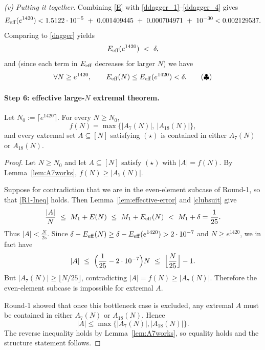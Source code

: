 \medskip
\noindent\emph{(v) Putting it together.}
Combining \eqref{E} with \eqref{ddagger_1}--\eqref{ddagger_4} gives
\[
E_{\rm eff}(e^{1420})
< 1.5122\cdot 10^{-5}\ +\ 0.001409445\ +\ 0.000704971\ +\ 10^{-30}
< 0.002129537.
\]
Comparing to \eqref{dagger} yields
\[
E_{\rm eff}(e^{1420})\ <\ \delta,
\]
and (since each term in $E_{\rm eff}$ decreases for larger $N$) we have
\[
\forall N\ge e^{1420},\qquad E_{\rm eff}(N)\le E_{\rm eff}(e^{1420})<\delta.
\tag{$\clubsuit$}
\]

\paragraph{Step 6: effective large-$N$ extremal theorem.}
\begin{theorem}\label{thm:effective-largeN}
Let $N_0:=\lceil e^{1420}\rceil$.  For every $N\ge N_0$,
\[
f(N)=\max\{|A_7(N)|,\ |A_{18}(N)|\},
\]
and every extremal set $A\subseteq [N]$ satisfying $(\star)$ is contained in either $A_7(N)$ or $A_{18}(N)$.
\end{theorem}

\begin{proof}
Let $N\ge N_0$ and let $A\subseteq [N]$ satisfy $(\star)$ with $|A|=f(N)$.
By Lemma~\ref{lem:A7works}, $f(N)\ge |A_7(N)|$.

Suppose for contradiction that we are in the even-element subcase of Round-1, so that \eqref{R1-Ineq} holds.  Then Lemma~\ref{lem:effective-error} and \eqref{clubsuit} give
\[
\frac{|A|}{N}\ \le\ M_1+E(N)\ \le\ M_1+E_{\rm eff}(N)\ <\ M_1+\delta=\frac{1}{25}.
\]
Thus $|A|<\frac{N}{25}$.  Since $\delta-E_{\rm eff}(N)\ge \delta-E_{\rm eff}(e^{1420})>2\cdot 10^{-7}$ and $N\ge e^{1420}$, we in fact have
\[
|A|\ \le\ \Bigl(\frac{1}{25}-2\cdot 10^{-7}\Bigr)N\ \le\ \Bigl\lfloor\frac{N}{25}\Bigr\rfloor-1.
\]
But $|A_7(N)|\ge \lfloor N/25\rfloor$, contradicting $|A|=f(N)\ge |A_7(N)|$.  Therefore the even-element subcase is impossible for extremal $A$.

Round-1 showed that once this bottleneck case is excluded, any extremal $A$ must be contained in either $A_7(N)$ or $A_{18}(N)$.  Hence
\[
|A|\le \max\{|A_7(N)|,|A_{18}(N)|\}.
\]
The reverse inequality holds by Lemma~\ref{lem:A7works}, so equality holds and the structure statement follows.
\end{proof}

